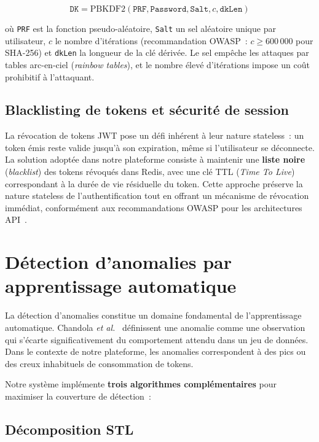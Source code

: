 \begin{equation}
\texttt{DK} = \text{PBKDF2}(\texttt{PRF}, \texttt{Password}, \texttt{Salt}, c, \texttt{dkLen})
\end{equation}

\noindent où \texttt{PRF} est la fonction pseudo-aléatoire, \texttt{Salt} un sel aléatoire unique par utilisateur, $c$ le nombre d'itérations (recommandation OWASP~: $c \geq 600\,000$ pour SHA-256) et \texttt{dkLen} la longueur de la clé dérivée. Le sel empêche les attaques par tables arc-en-ciel (\textit{rainbow tables}), et le nombre élevé d'itérations impose un coût prohibitif à l'attaquant.

\subsection{Blacklisting de tokens et sécurité de session}

La révocation de tokens JWT pose un défi inhérent à leur nature stateless~: un token émis reste valide jusqu'à son expiration, même si l'utilisateur se déconnecte. La solution adoptée dans notre plateforme consiste à maintenir une \textbf{liste noire} (\textit{blacklist}) des tokens révoqués dans Redis, avec une clé TTL (\textit{Time To Live}) correspondant à la durée de vie résiduelle du token. Cette approche préserve la nature stateless de l'authentification tout en offrant un mécanisme de révocation immédiat, conformément aux recommandations OWASP pour les architectures API~\cite{owasp2021}.


\section{Détection d'anomalies par apprentissage automatique}
\label{sec:anomaly}

La détection d'anomalies constitue un domaine fondamental de l'apprentissage automatique. Chandola \textit{et al.}~\cite{chandola2009} définissent une anomalie comme une observation qui s'écarte significativement du comportement attendu dans un jeu de données. Dans le contexte de notre plateforme, les anomalies correspondent à des pics ou des creux inhabituels de consommation de tokens.

Notre système implémente \textbf{trois algorithmes complémentaires} pour maximiser la couverture de détection~:

\subsection{Décomposition STL}

